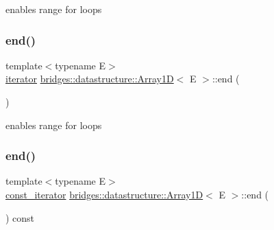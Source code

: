 enables range for loops 

\mbox{\label{classbridges_1_1datastructure_1_1_array1_d_a238e21eb9afcd0f32e3612b36b7d1a2a}} 
\subsubsection{\texorpdfstring{end()}{end()}\hspace{0.1cm}{\footnotesize\ttfamily [1/2]}}
{\footnotesize\ttfamily template$<$typename E$>$ \\
\mbox{\hyperlink{classbridges_1_1datastructure_1_1_array1_d_1_1iterator}{iterator}} \mbox{\hyperlink{classbridges_1_1datastructure_1_1_array1_d}{bridges\+::datastructure\+::\+Array1D}}$<$ E $>$\+::end (\begin{DoxyParamCaption}{ }\end{DoxyParamCaption})\hspace{0.3cm}{\ttfamily [inline]}}



enables range for loops 

\mbox{\label{classbridges_1_1datastructure_1_1_array1_d_afa8c2d7cb3db9a506baa18d383aabdb5}} 
\subsubsection{\texorpdfstring{end()}{end()}\hspace{0.1cm}{\footnotesize\ttfamily [2/2]}}
{\footnotesize\ttfamily template$<$typename E$>$ \\
\mbox{\hyperlink{classbridges_1_1datastructure_1_1_array1_d_1_1const__iterator}{const\+\_\+iterator}} \mbox{\hyperlink{classbridges_1_1datastructure_1_1_array1_d}{bridges\+::datastructure\+::\+Array1D}}$<$ E $>$\+::end (\begin{DoxyParamCaption}{ }\end{DoxyParamCaption}) const\hspace{0.3cm}{\ttfamily [inline]}}



